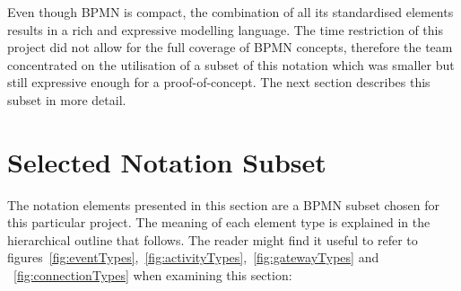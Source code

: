 \documentclass[11pt, a4paper, oneside, openright]{article}
\begin{document}
Even though BPMN is compact, the combination of all its standardised elements
results in a rich and expressive modelling language. The time restriction of this
project did not allow for the full coverage of BPMN concepts, therefore the team
concentrated on the utilisation of a subset of this notation which was smaller
but still expressive enough for a proof-of-concept. The next section describes
this subset in more detail.

\section{Selected Notation Subset}

The notation elements presented in this section are a BPMN subset chosen for
this particular project. The meaning of each element type is explained in the
hierarchical outline that follows. The reader might find it useful to refer to
figures~\ref{fig:eventTypes},~\ref{fig:activityTypes},~\ref{fig:gatewayTypes} and
~\ref{fig:connectionTypes} when examining this section:
\\\\
\end{document}
